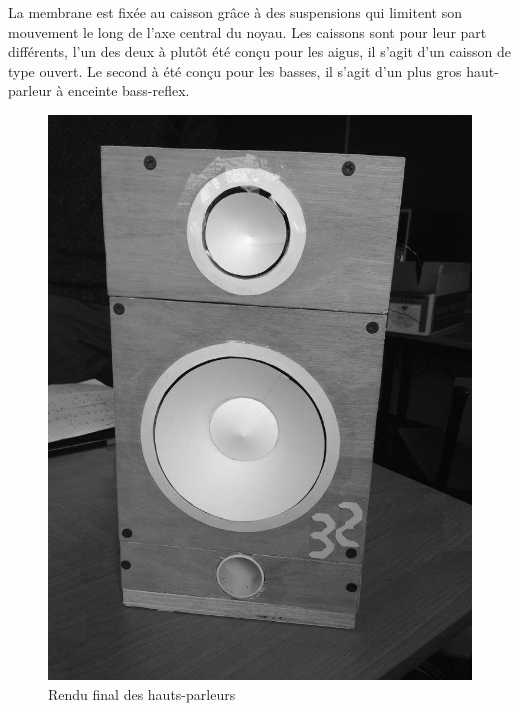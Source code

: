 La membrane est fixée au caisson grâce à des suspensions qui limitent son mouvement le long de l'axe central du noyau. Les caissons sont pour leur part différents, l'un des deux à plutôt été conçu pour les aigus, il s'agit d'un caisson de type ouvert. Le second à été conçu pour les basses, il s'agit d'un plus gros haut-parleur à enceinte bass-reflex. 


\begin{figure}	
\begin{center}
\includegraphics[scale=0.5]{img/PhotoHP} 
\end{center}
\caption{Rendu final des hauts-parleurs}		
\label{fig:PhotoHP}		
\end{figure}




